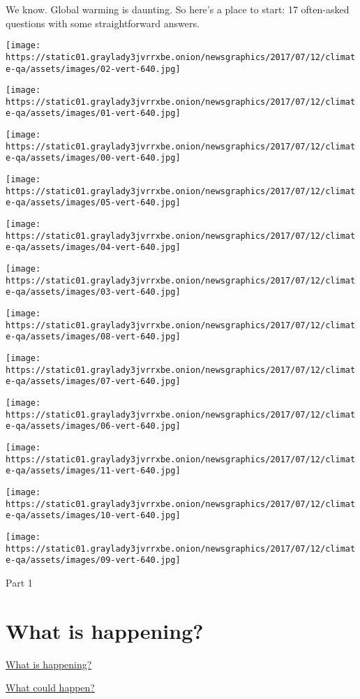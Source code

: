 We know. Global warming is daunting. So here's a place to start: 17
often-asked questions with some straightforward answers.

\texttt{[image: https://static01.graylady3jvrrxbe.onion/newsgraphics/2017/07/12/climate-qa/assets/images/02-vert-640.jpg]}

\texttt{[image: https://static01.graylady3jvrrxbe.onion/newsgraphics/2017/07/12/climate-qa/assets/images/01-vert-640.jpg]}

\texttt{[image: https://static01.graylady3jvrrxbe.onion/newsgraphics/2017/07/12/climate-qa/assets/images/00-vert-640.jpg]}

\texttt{[image: https://static01.graylady3jvrrxbe.onion/newsgraphics/2017/07/12/climate-qa/assets/images/05-vert-640.jpg]}

\texttt{[image: https://static01.graylady3jvrrxbe.onion/newsgraphics/2017/07/12/climate-qa/assets/images/04-vert-640.jpg]}

\texttt{[image: https://static01.graylady3jvrrxbe.onion/newsgraphics/2017/07/12/climate-qa/assets/images/03-vert-640.jpg]}

\texttt{[image: https://static01.graylady3jvrrxbe.onion/newsgraphics/2017/07/12/climate-qa/assets/images/08-vert-640.jpg]}

\texttt{[image: https://static01.graylady3jvrrxbe.onion/newsgraphics/2017/07/12/climate-qa/assets/images/07-vert-640.jpg]}

\texttt{[image: https://static01.graylady3jvrrxbe.onion/newsgraphics/2017/07/12/climate-qa/assets/images/06-vert-640.jpg]}

\texttt{[image: https://static01.graylady3jvrrxbe.onion/newsgraphics/2017/07/12/climate-qa/assets/images/11-vert-640.jpg]}

\texttt{[image: https://static01.graylady3jvrrxbe.onion/newsgraphics/2017/07/12/climate-qa/assets/images/10-vert-640.jpg]}

\texttt{[image: https://static01.graylady3jvrrxbe.onion/newsgraphics/2017/07/12/climate-qa/assets/images/09-vert-640.jpg]}

Part 1

\hypertarget{what-is-happening}{%
\section{What is happening?}\label{what-is-happening}}

\protect\hyperlink{chapterone}{What is happening?}

\protect\hyperlink{chaptertwo}{What could happen?}

